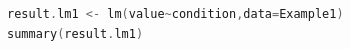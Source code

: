 \begin{lstlisting}[language=c++,label={code:23_06},caption={lm関数で分析}]
result.lm1 <- lm(value~condition,data=Example1)
summary(result.lm1)
\end{lstlisting}

